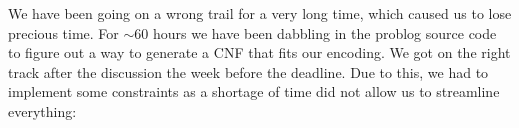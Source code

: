 \begin{table}[h]
\centering
\caption{Results task Bayesian network}
\label{table:results-bayesian}
\end{table}
\vspace{5mm}
We have been going on a wrong trail for a very long time, which caused us to lose precious time.  For $\sim$60 hours we have been dabbling in the problog source code to figure out a way to generate a CNF that fits our encoding. We got on the right track after the discussion the week before the deadline. Due to this, we had to implement some constraints as a shortage of time did not allow us to streamline everything:
